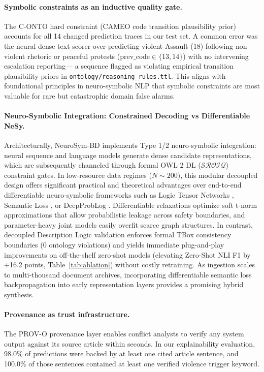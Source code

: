 \documentclass[11pt,a4paper]{article}
\begin{document}
\paragraph{Symbolic constraints as an inductive quality gate.}
The C-ONTO hard constraint (CAMEO code transition plausibility prior) accounts for
all 14 changed prediction traces in our test set.
A common error was the neural dense text scorer over-predicting violent Assault (18)
following non-violent rhetoric or peaceful protests ($\text{prev\_code} \in \{13, 14\}$) with no intervening escalation reporting—
a sequence flagged as violating empirical transition plausibility priors in \texttt{ontology/reasoning\_rules.ttl}.
This aligns with foundational principles in neuro-symbolic NLP \citep{garcez2023}
that symbolic constraints are most valuable for rare but catastrophic domain false alarms.

\paragraph{Neuro-Symbolic Integration: Constrained Decoding vs Differentiable NeSy.}
Architecturally, NeuroSym-BD implements Type 1/2 neuro-symbolic integration: neural sequence and language models generate dense candidate representations, which are subsequently channeled through formal OWL 2 DL ($\mathcal{SROIQ}$) constraint gates.
In low-resource data regimes ($N \sim 200$), this modular decoupled design offers significant practical and theoretical advantages over end-to-end differentiable neuro-symbolic frameworks such as Logic Tensor Networks \citep{serafini2016logic}, Semantic Loss \citep{xu2018semantic}, or DeepProbLog \citep{manhaeve2018deepproblog}.
Differentiable relaxations optimize soft t-norm approximations that allow probabilistic leakage across safety boundaries, and parameter-heavy joint models easily overfit scarce graph structures.
In contrast, decoupled Description Logic validation enforces formal TBox consistency boundaries (0 ontology violations) and yields immediate plug-and-play improvements on off-the-shelf zero-shot models (elevating Zero-Shot NLI F1 by +16.2 points, Table~\ref{tab:ablation}) without costly retraining.
As ingestion scales to multi-thousand document archives, incorporating differentiable semantic loss backpropagation into early representation layers provides a promising hybrid synthesis.

\paragraph{Provenance as trust infrastructure.}
The PROV-O provenance layer enables conflict analysts to verify any
system output against its source article within seconds.
In our explainability evaluation, 98.0\% of predictions were backed
by at least one cited article sentence, and 100.0\% of those sentences
contained at least one verified violence trigger keyword.
\end{document}
